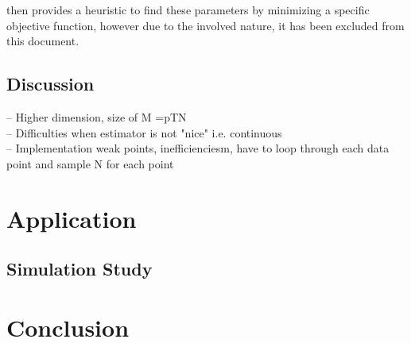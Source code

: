 \documentclass{article}
\begin{document}
\cite{cpmmDeligiannidis2015} then provides a heuristic to find these parameters by minimizing a specific objective function, however due to the involved nature, it has been excluded from this document.



\subsection{Discussion}
    -- Higher dimension, size of M =pTN \\
    -- Difficulties when estimator is not "nice" i.e. continuous \\
    -- Implementation weak points, inefficienciesm, have to loop through each data point and sample N for each point



  \section{Application}

  \subsection{Simulation Study}

  \section{Conclusion}
\end{document}
